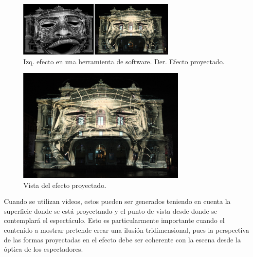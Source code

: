 \begin{minipage}{0.50\textwidth}
	\begin{flushleft} \large
		\begin{figure}[H]
		  \centering
			\includegraphics[width=0.7\textwidth]{./Cap2_videomapping/celestin_head.jpg}
		  \caption[http://mappingvideo.blogspot.com/]{Izq. efecto en una herramienta de software. Der. Efecto proyectado.}
		  \label{fig:Efecto1}
		\end{figure}
	\end{flushleft}
\end{minipage}
\begin{minipage}{0.50\textwidth}
	\begin{flushright} \large
		\begin{figure}[H]
		  \centering
			\includegraphics[width=0.75\textwidth]{./Cap2_videomapping/realcelestins_headshot.jpg}
		  \caption[http://mappingvideo.blogspot.com/]{Vista del efecto proyectado.}
		  \label{fig:Efecto2}
		\end{figure}
	\end{flushright}
\end{minipage}

Cuando se utilizan videos, estos pueden ser generados teniendo en cuenta la superficie donde se está proyectando y el punto de vista desde donde se contemplará el espectáculo. Esto es particularmente importante cuando el contenido a mostrar pretende crear una ilusión tridimensional, pues la perspectiva de las formas proyectadas en el efecto debe ser coherente con la escena desde la óptica de los espectadores.


